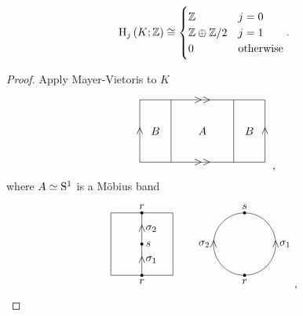 \begin{lemma}
$$ \H_j\br{K; \ZZ} \cong
\begin{cases}
\ZZ & j = 0 \\
\ZZ \oplus \ZZ / 2 & j = 1 \\
0 & \text{otherwise}
\end{cases}.
$$
\end{lemma}

\begin{proof}
Apply Mayer-Vietoris to $ K $
$$
\begin{tikzpicture}
\draw (-2, -1) to node{$ \wedge $} (-2, 1);
\draw (2, -1) to node{$ \wedge $} (2, 1);
\draw (-2, 1) to node{$ >> $} (2, 1);
\draw (-2, -1) to node{$ >> $} (2, -1);
\draw (-1, -1) to (-1, 1);
\draw (1, -1) to (1, 1);
\draw (0, 0) node{$ A $};
\draw (-1.5, 0) node{$ B $};
\draw (1.5, 0) node{$ B $};
\end{tikzpicture},
$$
where $ A \simeq \S^1 $ is a M\"obius band
$$
\begin{tikzpicture}
\draw (-1, -1) to (-1, 1);
\draw (1, -1) to (1, 1);
\draw (-1, 1) to (1, 1);
\draw (-1, -1) to (1, -1);
\draw (0, -1) to node{$ \wedge $} node[right]{$ \sigma_1 $} (0, 0);
\draw (0, 0) to node{$ \wedge $} node[right]{$ \sigma_2 $} (0, 1);
\fill (0, 0) circle (0.05) node[right]{$ s $};
\fill (0, -1) circle (0.05) node[below]{$ r $};
\fill (0, 1) circle (0.05) node[above]{$ r $};
\end{tikzpicture}
\qquad
\begin{tikzpicture}
\draw (0, 0) circle (1);
\fill (0, -1) circle (0.05) node[below]{$ r $};
\draw (1, 0) node{$ \wedge $} node[right]{$ \sigma_1 $};
\fill (0, 1) circle (0.05) node[above]{$ s $};
\draw (-1, 0) node{$ \wedge $} node[left]{$ \sigma_2 $};
\end{tikzpicture},
$$

\pagebreak


\end{proof}
